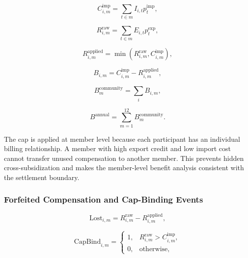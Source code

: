 \begin{equation}
\label{eq:monthly_import_cost}
C^{\mathrm{imp}}_{i,m} = \sum_{t \in m} I_{i,t}p^{\mathrm{imp}}_t,
\end{equation}

\begin{equation}
\label{eq:raw_export_compensation}
R^{\mathrm{raw}}_{i,m} = \sum_{t \in m} E_{i,t}p^{\mathrm{exp}}_t,
\end{equation}

\begin{equation}
\label{eq:applied_export_compensation}
R^{\mathrm{applied}}_{i,m} = \min\left(R^{\mathrm{raw}}_{i,m}, C^{\mathrm{imp}}_{i,m}\right),
\end{equation}

\begin{equation}
\label{eq:net_monthly_energy_bill}
B_{i,m} = C^{\mathrm{imp}}_{i,m} - R^{\mathrm{applied}}_{i,m},
\end{equation}

\begin{equation}
\label{eq:community_monthly_bill}
B^{\mathrm{community}}_m = \sum_i B_{i,m},
\end{equation}

\begin{equation}
\label{eq:annual_bill}
B^{\mathrm{annual}} = \sum_{m=1}^{12} B^{\mathrm{community}}_m.
\end{equation}

The cap is applied at member level because each participant has an individual billing relationship. A member with high export credit and low import cost cannot transfer unused compensation to another member. This prevents hidden cross-subsidization and makes the member-level benefit analysis consistent with the settlement boundary.

\subsubsection{Forfeited Compensation and Cap-Binding Events}
\label{subsec:forfeited_compensation_cap_binding}

\begin{equation}
\label{eq:lost_compensation}
\mathrm{Lost}_{i,m} = R^{\mathrm{raw}}_{i,m} - R^{\mathrm{applied}}_{i,m},
\end{equation}

\begin{equation}
\label{eq:cap_binding}
\mathrm{CapBind}_{i,m} =
\begin{cases}
1, & R^{\mathrm{raw}}_{i,m} > C^{\mathrm{imp}}_{i,m}, \\
0, & \text{otherwise},
\end{cases}
\end{equation}

